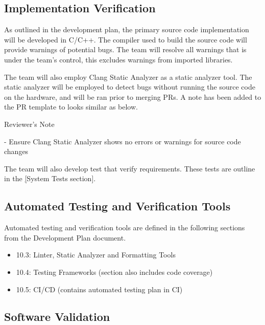 \documentclass[12pt, titlepage]{article}
\newenvironment{shadedquotation}
    {\begin{shaded*}
     \quoting[leftmargin=0pt, vskip=0pt]}
    {\endquoting
     \end{shaded*}}
\begin{document}
\subsection{Implementation Verification}\label{sec:implementation_verification}

As outlined in the development plan, the primary source code implementation
will be developed in C/C++. The compiler used to build the source code
will provide warnings of potential bugs. The team will resolve all
warnings that is under the team's control, this excludes warnings from
imported libraries. \newline

The team will also employ Clang Static Analyzer \cite{clangStaticAnalyzer} as
a static analyzer tool. The static analyzer will be employed to detect bugs
without running the source code on the hardware, and will be ran prior to
merging PRs. A note has been added to the PR template to looks similar as below.

\begin{shadedquotation}
Reviewer's Note

- Ensure Clang Static Analyzer shows no errors or warnings for source code
changes
\end{shadedquotation}

The team will also develop test that verify requirements. These tests are
outline in the \hyperref[sec:system_tests][System Tests section].

\subsection{Automated Testing and Verification Tools}
\label{sec:testing_tools}

Automated testing and verification tools are defined in the following sections
from the Development Plan document.

\begin{itemize}
  \item 10.3: Linter, Static Analyzer and Formatting Tools
  \item 10.4: Testing Frameworks (section also includes code coverage)
  \item 10.5: CI/CD (contains automated testing plan in CI)
\end{itemize}

\subsection{Software Validation}\label{sec:software_validation}
\end{document}
